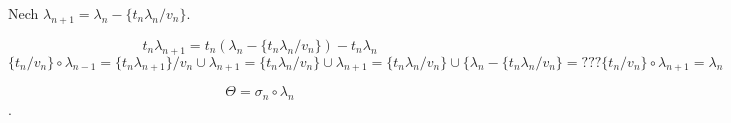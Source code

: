\par Nech $\lambda_{n+1} = \lambda_n - \{t_n\lambda_n/v_n\}$. 

$$t_n\lambda_{n+1} = t_n (\lambda_n - \{t_n\lambda_n / v_n\}) -  t_n\lambda_n$$
$$\{ t_n / v_n\} \circ \lambda_{n-1} = \{t_n \lambda_{n+1}\}/v_n \cup
\lambda_{n+1} = \{t_n\lambda_n /v_n\} \cup \lambda_{n+1} = \{t_n\lambda_n/v_n\}
\cup \{ \lambda_n - \{ t_n\lambda_n/v_n\} = ??? \{ t_n/v_n \} \circ
\lambda_{n+1} = \lambda_n$$

$$\Theta = \sigma_n \circ \lambda_n$$.

